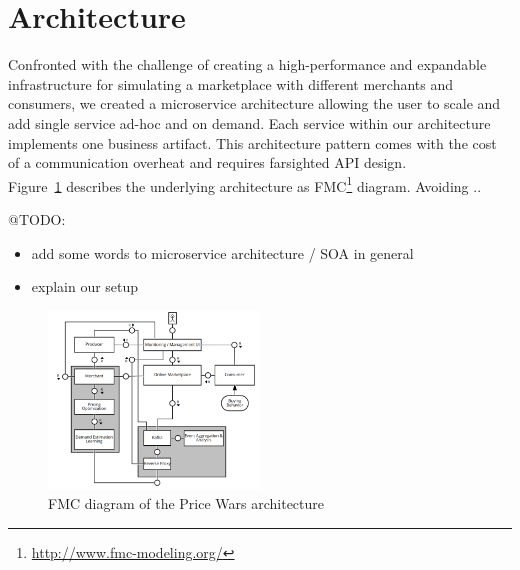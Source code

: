 \section{Architecture}
\label{sec:Architecture}
%
Confronted with the challenge of creating a high-performance and expandable infrastructure for simulating a marketplace with different merchants and consumers, we created a microservice architecture allowing the user to scale and add single service ad-hoc and on demand. Each service within our architecture implements one business artifact. This architecture pattern comes with the cost of a communication overheat and requires farsighted API design.\\

Figure~\ref{fig:fmc} describes the underlying architecture as FMC\footnote{\url{http://www.fmc-modeling.org/}} diagram. Avoiding ..

@TODO:

\begin{itemize}
\item add some words to microservice architecture / SOA in general
\item explain our setup
\end{itemize}

%
\begin{figure}[h]
    \centering
    \includegraphics[width=0.5\textwidth]{images/architecture_fmc.png}
    \caption{FMC diagram of the Price Wars architecture}
    \label{fig:fmc}
\end{figure}
%